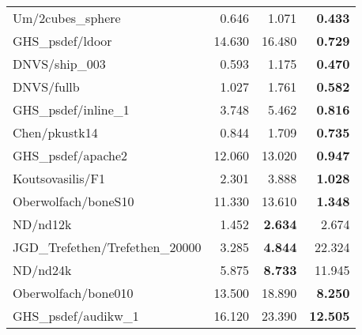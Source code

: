 \begin{tabular}{l|rr|r}
                       Um/2cubes\_sphere & 0.646                     & 1.071     & \bf 0.433  \\
                        GHS\_psdef/ldoor & 14.630                    & 16.480    & \bf 0.729  \\
                          DNVS/ship\_003 & 0.593                     & 1.175     & \bf 0.470  \\
                              DNVS/fullb & 1.027                     & 1.761     & \bf 0.582  \\
                    GHS\_psdef/inline\_1 & 3.748                     & 5.462     & \bf 0.816  \\
                           Chen/pkustk14 & 0.844                     & 1.709     & \bf 0.735  \\
                      GHS\_psdef/apache2 & 12.060                    & 13.020    & \bf 0.947  \\
                        Koutsovasilis/F1 & 2.301                     & 3.888     & \bf 1.028  \\
                     Oberwolfach/boneS10 & 11.330                    & 13.610    & \bf 1.348  \\
                                ND/nd12k & 1.452                     & \bf 2.634 & 2.674      \\
         JGD\_Trefethen/Trefethen\_20000 & 3.285                     & \bf 4.844 & 22.324     \\
                                ND/nd24k & 5.875                     & \bf 8.733 & 11.945     \\
                     Oberwolfach/bone010 & 13.500                    & 18.890    & \bf 8.250  \\
                    GHS\_psdef/audikw\_1 & 16.120                    & 23.390    & \bf 12.505 \\
  \hline
\end{tabular}
